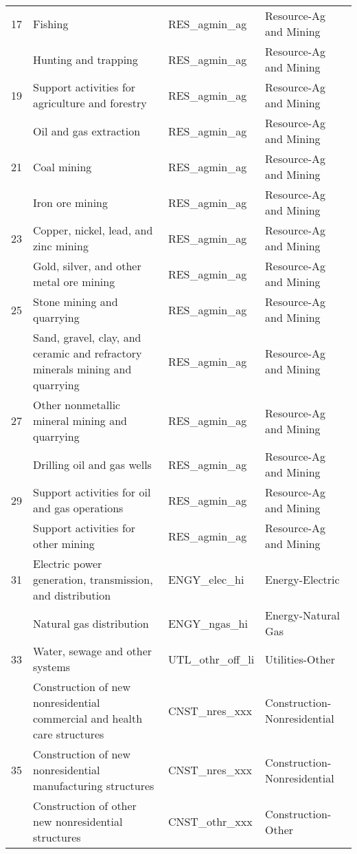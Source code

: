 \begin{landscape}
\begin{small}
\begin{longtable}{clll}
17 & Fishing & RES\_agmin\_ag & Resource-Ag and Mining \\
\gray 18 & Hunting and trapping & RES\_agmin\_ag & Resource-Ag and Mining \\
19 & Support activities for agriculture and forestry & RES\_agmin\_ag & Resource-Ag and Mining \\
\gray 20 & Oil and gas extraction & RES\_agmin\_ag & Resource-Ag and Mining \\
21 & Coal mining & RES\_agmin\_ag & Resource-Ag and Mining \\
\gray 22 & Iron ore mining & RES\_agmin\_ag & Resource-Ag and Mining \\
23 & Copper, nickel, lead, and zinc mining & RES\_agmin\_ag & Resource-Ag and Mining \\
\gray 24 & Gold, silver, and other metal ore mining & RES\_agmin\_ag & Resource-Ag and Mining \\
25 & Stone mining and quarrying & RES\_agmin\_ag & Resource-Ag and Mining \\
\gray 26 & Sand, gravel, clay, and ceramic and refractory minerals mining and quarrying & RES\_agmin\_ag & Resource-Ag and Mining \\
27 & Other nonmetallic mineral mining and quarrying & RES\_agmin\_ag & Resource-Ag and Mining \\
\gray 28 & Drilling oil and gas wells & RES\_agmin\_ag & Resource-Ag and Mining \\
29 & Support activities for oil and gas operations & RES\_agmin\_ag & Resource-Ag and Mining \\
\gray 30 & Support activities for other mining & RES\_agmin\_ag & Resource-Ag and Mining \\
31 & Electric power generation, transmission, and distribution & ENGY\_elec\_hi & Energy-Electric \\
\gray 32 & Natural gas distribution & ENGY\_ngas\_hi & Energy-Natural Gas \\
33 & Water, sewage and other systems & UTL\_othr\_off\_li & Utilities-Other \\
\gray 34 & Construction of new nonresidential commercial and health care structures & CNST\_nres\_xxx & Construction-Nonresidential \\
35 & Construction of new nonresidential manufacturing structures & CNST\_nres\_xxx & Construction-Nonresidential \\
\gray 36 & Construction of other new nonresidential structures & CNST\_othr\_xxx & Construction-Other \\

\end{longtable}
\end{small}
\end{landscape}
